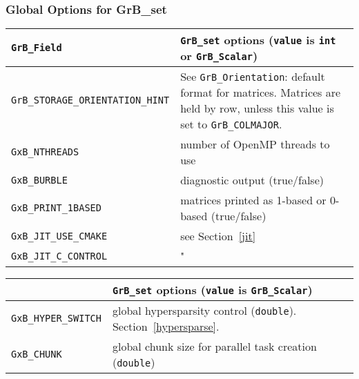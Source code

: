 \subsubsection{Global Options for {\sf GrB\_set}}

\noindent
{\small
\begin{tabular}{p{2.2in}p{3.5in}}
\hline
\verb'GrB_Field'                    & \verb'GrB_set' options (\verb'value' is \verb'int' or \verb'GrB_Scalar') \\
\hline
\verb'GrB_STORAGE_ORIENTATION_HINT' & See \verb'GrB_Orientation': default format for matrices.
                                      Matrices are held by row, unless this
                                      value is set to \verb'GrB_COLMAJOR'. \\
\hline
\verb'GxB_NTHREADS'                 & number of OpenMP threads to use \\
\verb'GxB_BURBLE'                   & diagnostic output (true/false) \\
\verb'GxB_PRINT_1BASED'             & matrices printed as 1-based or 0-based (true/false) \\
\verb'GxB_JIT_USE_CMAKE'            & see Section~\ref{jit} \\
\verb'GxB_JIT_C_CONTROL'            & " \\
\hline
\end{tabular}
}

\noindent
{\small
\begin{tabular}{p{2.2in}p{3.5in}}
\hline
                                    & \verb'GrB_set' options (\verb'value' is \verb'GrB_Scalar') \\
\hline
\verb'GxB_HYPER_SWITCH'             & global hypersparsity control (\verb'double').
                                        Section~\ref{hypersparse}. \\
\verb'GxB_CHUNK'                    & global chunk size for parallel task creation (\verb'double') \\
\hline
\end{tabular}
}

